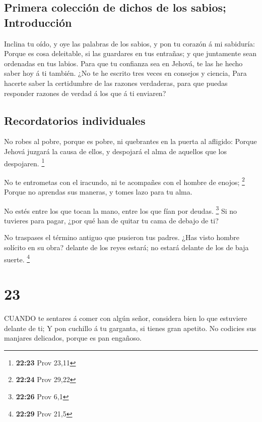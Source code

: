 \hypertarget{primera-colecciuxf3n-de-dichos-de-los-sabios-introducciuxf3n}{%
\subsection{Primera colección de dichos de los sabios;
Introducción}\label{primera-colecciuxf3n-de-dichos-de-los-sabios-introducciuxf3n}}

 Inclina tu oído, y oye las palabras de los sabios, y pon
tu corazón á mi sabiduría:  Porque es cosa deleitable, si
las guardares en tus entrañas; y que juntamente sean ordenadas en tus
labios.  Para que tu confianza sea en Jehová, te las he
hecho saber hoy á ti también.  ¿No te he escrito tres veces
en consejos y ciencia,  Para hacerte saber la certidumbre
de las razones verdaderas, para que puedas responder razones de verdad á
los que á ti enviaren?

\hypertarget{recordatorios-individuales}{%
\subsection{Recordatorios
individuales}\label{recordatorios-individuales}}

 No robes al pobre, porque es pobre, ni quebrantes en la
puerta al afligido:  Porque Jehová juzgará la causa de
ellos, y despojará el alma de aquellos que los despojaren. \footnote{\textbf{22:23}
  Prov 23,11}

 No te entrometas con el iracundo, ni te acompañes con el
hombre de enojos; \footnote{\textbf{22:24} Prov 29,22} 
Porque no aprendas sus maneras, y tomes lazo para tu alma.

 No estés entre los que tocan la mano, entre los que fían
por deudas. \footnote{\textbf{22:26} Prov 6,1}  Si no
tuvieres para pagar, ¿por qué han de quitar tu cama de debajo de ti?

 No traspases el término antiguo que pusieron tus padres.
 ¿Has visto hombre solícito en su obra? delante de los
reyes estará; no estará delante de los de baja suerte. \footnote{\textbf{22:29}
  Prov 21,5}

\hypertarget{section-22}{%
\section{23}\label{section-22}}

 CUANDO te sentares á comer con algún señor, considera bien
lo que estuviere delante de ti;  Y pon cuchillo á tu
garganta, si tienes gran apetito.  No codicies sus manjares
delicados, porque es pan engañoso.

